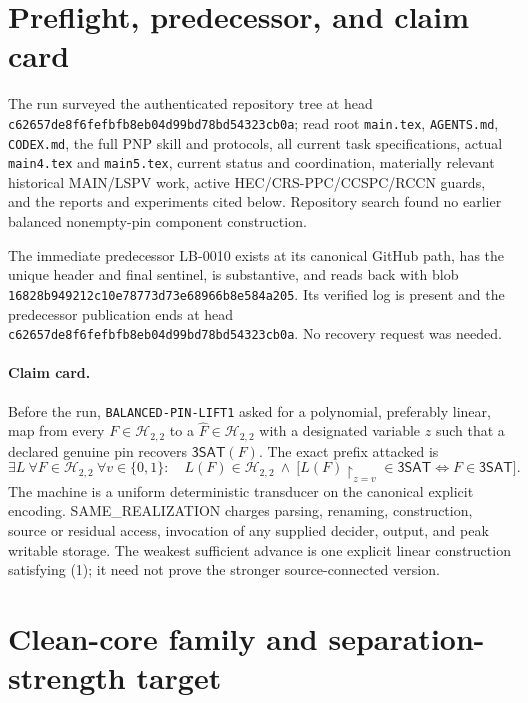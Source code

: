 \documentclass[11pt]{article}
\newcommand{\SAT}{\mathsf{3SAT}}
\begin{document}
\section{Preflight, predecessor, and claim card}

The run surveyed the authenticated repository tree at head
\texttt{c62657de8f6fefbfb8eb04d99bd78bd54323cb0a}; read root
\texttt{main.tex}, \texttt{AGENTS.md}, \texttt{CODEX.md}, the full PNP skill
and protocols, all current task specifications, actual \texttt{main4.tex}
and \texttt{main5.tex}, current status and coordination, materially relevant
historical MAIN/LSPV work, active HEC/CRS-PPC/CCSPC/RCCN guards, and the
reports and experiments cited below.  Repository search found no earlier
balanced nonempty-pin component construction.

The immediate predecessor LB-0010 exists at its canonical GitHub path, has
the unique header and final sentinel, is substantive, and reads back with
blob \texttt{16828b949212c10e78773d73e68966b8e584a205}.  Its verified log is
present and the predecessor publication ends at head
\texttt{c62657de8f6fefbfb8eb04d99bd78bd54323cb0a}.  No recovery request was
needed.

\paragraph{Claim card.}
Before the run, \texttt{BALANCED-PIN-LIFT1} asked for a polynomial,
preferably linear, map from every $F\in\mathcal H_{2,2}$ to a
$\widehat F\in\mathcal H_{2,2}$ with a designated variable $z$ such that a
declared genuine pin recovers $\SAT(F)$.  The exact prefix attacked is
\[
 \exists L\ \forall F\in\mathcal H_{2,2}\ \forall v\in\{0,1\}:
 \quad L(F)\in\mathcal H_{2,2}
 \ \wedge\
 \bigl[L(F)\upharpoonright_{z=v}\in\SAT
       \iff F\in\SAT\bigr].                                  \tag{1}
\]
The machine is a uniform deterministic transducer on the canonical explicit
encoding.  SAME\_REALIZATION charges parsing, renaming, construction,
source or residual access, invocation of any supplied decider, output, and
peak writable storage.  The weakest sufficient advance is one explicit
linear construction satisfying (1); it need not prove the stronger
source-connected version.

\section{Clean-core family and separation-strength target}
\end{document}
